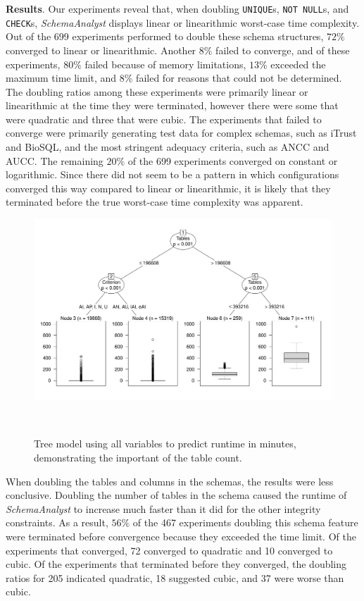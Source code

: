 
\textbf{Results}. Our experiments reveal that, when doubling \texttt{UNIQUE}s, {\tt NOT NULL}s, and {\tt CHECK}s,
\textit{SchemaAnalyst} displays linear or linearithmic worst-case time complexity.  Out of the 699 experiments performed
to double these schema structures, $72\%$ converged to linear or linearithmic.  Another $8\%$ failed to converge, and of
these experiments, $80\%$ failed because of memory limitations, $13\%$ exceeded the maximum time limit, and $8\%$ failed
for reasons that could not be determined.  The doubling ratios among these experiments were primarily linear or
linearithmic at the time they were terminated, however there were some that were quadratic and three that were cubic.
The experiments that failed to converge were primarily generating test data for complex schemas, such as iTrust and
BioSQL, and the most stringent adequacy criteria, such as ANCC and AUCC. The remaining $20\%$ of the 699 experiments
converged on constant or logarithmic.  Since there did not seem to be a pattern in which configurations converged this
way compared to linear or linearithmic, it is likely that they terminated before the true worst-case time complexity was
apparent.

\begin{figure}[t]
\centering
  \centering
  \includegraphics[width=1.025\linewidth]{diagrams/AllTree.pdf}
  \vspace*{-.25in}
  \caption{Tree model using all variables to predict runtime in minutes, demonstrating the important of the table count.
  \vspace{-.315in}}~\label{fig:atree}
\end{figure}

When doubling the tables and columns in the schemas, the results were less conclusive. Doubling the number of tables in
the schema caused the runtime of \textit{SchemaAnalyst} to increase much faster than it did for the other integrity
constraints. As a result, $56\%$ of the 467 experiments doubling this schema feature were terminated before convergence
because they exceeded the time limit.  Of the experiments that converged, 72 converged to quadratic and 10 converged to
cubic.  Of the experiments that terminated before they converged, the doubling ratios for 205 indicated quadratic, 18
suggested cubic, and 37 were worse than cubic.

